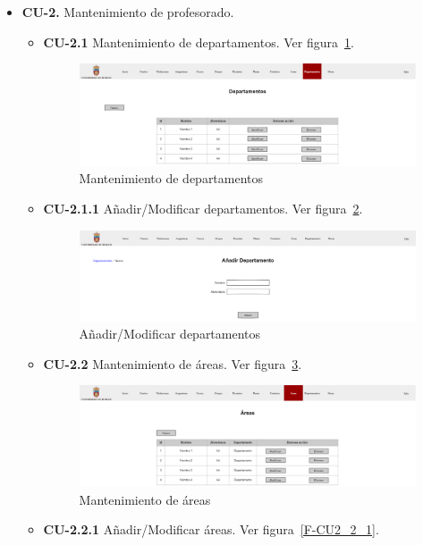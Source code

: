 \begin{itemize}
\newpage	
	\item \textbf{CU-2.} Mantenimiento de profesorado.
	\begin{itemize}
		\item \textbf{CU-2.1} Mantenimiento de departamentos. Ver figura~\ref{F-CU2_1}.
		\begin{figure}[!h]
		\centering
		\includegraphics[width=\textwidth]{../img/Anexos/Vistas/departamentos.png}
		\caption{Mantenimiento de departamentos}\label{F-CU2_1}
		\end{figure}
		\FloatBarrier
		\item \textbf{CU-2.1.1} Añadir/Modificar departamentos. Ver figura~\ref{F-CU2_1_1}.
		\begin{figure}[!h]
		\centering
		\includegraphics[width=\textwidth]{../img/Anexos/Vistas/add_departamento.png}
		\caption{Añadir/Modificar departamentos}\label{F-CU2_1_1}
		\end{figure}
		\FloatBarrier
\newpage
		\item \textbf{CU-2.2} Mantenimiento de áreas. Ver figura~\ref{F-CU2_2}.
		\begin{figure}[!h]
		\centering
		\includegraphics[width=\textwidth]{../img/Anexos/Vistas/areas.png}
		\caption{Mantenimiento de áreas}\label{F-CU2_2}
		\end{figure}
		\FloatBarrier
		\item \textbf{CU-2.2.1} Añadir/Modificar áreas. Ver figura~\ref{F-CU2_2_1}.

\end{itemize}
\end{itemize}
